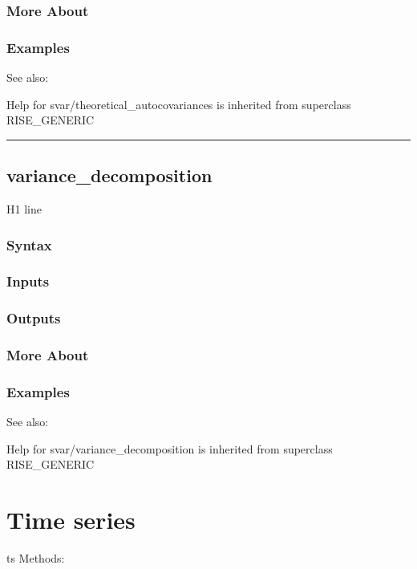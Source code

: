 \documentclass[letterpaper,10pt,english]{sphinxmanual}
\begin{document}
\subsection{More About}
\label{classes/models/@svar/svar:id151}

\subsection{Examples}
\label{classes/models/@svar/svar:id152}
See also:

Help for svar/theoretical\_autocovariances is inherited from superclass RISE\_GENERIC


\bigskip\hrule{}\bigskip



\section{variance\_decomposition}
\label{classes/models/@svar/svar:variance-decomposition}\label{classes/models/@svar/svar:id153}
H1 line


\subsection{Syntax}
\label{classes/models/@svar/svar:id154}

\subsection{Inputs}
\label{classes/models/@svar/svar:id155}

\subsection{Outputs}
\label{classes/models/@svar/svar:id156}

\subsection{More About}
\label{classes/models/@svar/svar:id157}

\subsection{Examples}
\label{classes/models/@svar/svar:id158}
See also:

Help for svar/variance\_decomposition is inherited from superclass RISE\_GENERIC


\chapter{Time series}
\label{classes/time_series/@ts/ts:time-series}\label{classes/time_series/@ts/ts::doc}
ts Methods:
\end{document}

